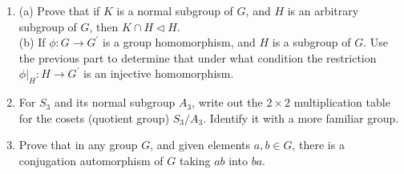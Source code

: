 \documentclass[12pt]{article}
\theoremstyle{plain}
\theoremstyle{definition}
\theoremstyle{remark}
\begin{document}
\begin{enumerate}
\item (a) Prove that if $K $ is a normal subgroup of $G$, and $H$ is an arbitrary subgroup of $G$, then $K\cap H \lhd H$.\\
(b) If $\phi: G\to G^\prime$ is a group homomorphism, and $H$ is a subgroup of $G$. Use the previous part to determine that under what condition the restriction $\phi|_H: H\to G^\prime$ is an injective homomorphism.
\item For $S_3$ and its normal subgroup $A_3$, write out the $2\times 2$ multiplication table for the cosets (quotient group) $S_3/A_3$. Identify it with a more familiar group.
\item Prove that in any group $G$, and given elements $a,b\in G$, there is a conjugation automorphism of $G$ taking $ab$ into $ba$.
\end{enumerate}
\end{document}
